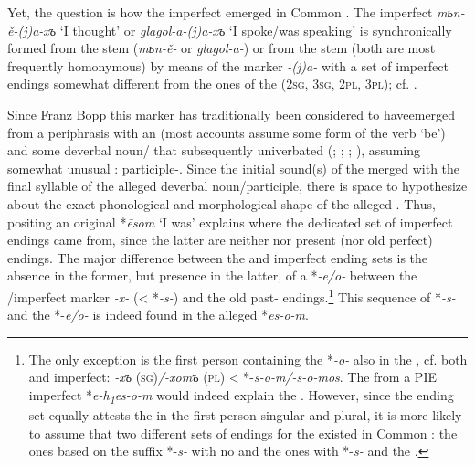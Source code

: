 \documentclass[output=paper]{langsci/langscibook}
\begin{document}
Yet, the question is how the imperfect emerged in Common . The  imperfect \textit{m}\textit{ь}\textit{n-ě-(j)a-x}\textit{ъ} ‘I thought’ or \textit{glagol-a-(j)a-x}\textit{ъ} ‘I spoke/was speaking’ is synchronically formed from the  stem (\textit{m}\textit{ь}\textit{n-ě-} or \textit{glagol-a-}) or from the  stem (both are most frequently homonymous) by means of the marker \textit{-(j)a-} with a set of imperfect endings somewhat different from the ones of the  (\textsc{2sg, 3sg, 2pl, 3pl}); cf. \citet[359]{Pohl1971}.

Since Franz Bopp this marker has traditionally been considered to have\linebreak emerged from a periphrasis with an  (most accounts assume some form of the verb ‘be’) and some deverbal noun/ that subsequently univerbated (\citealt{Leskien1919}; \citealt[82]{Stang1942}; \citealt[253ff.]{Kortlandt1986}; \citealt{Lühr1999}), assuming somewhat unusual : participle-. Since the initial sound(s) of the  merged with the final syllable of the alleged deverbal noun\slash par\-ti\-ci\-ple, there is space to hypothesize about the exact phonological and morphological shape of the alleged . Thus, positing an original  *\textit{ēsom} ‘I was’ explains where the dedicated set of imperfect endings came from, since the latter are neither  nor present (nor old perfect) endings. The major difference between the  and imperfect ending sets is the absence in the former, but presence in the latter, of a  *\textit{-e/o-} between the /imperfect marker \textit{-x-} (< *\textit{-s-}) and the old past- endings.\footnote{The only exception is the first person containing the  *\textit{-o-} also in the , cf. both  and imperfect: \textit{-x}\textit{ъ} (\textsc{sg})\textit{/-xom}\textit{ъ} (\textsc{pl}) < *-\textit{s-o-m/-s-o-mos}. The  from a PIE imperfect *\textit{e-h\textsubscript{1}es-o-m} would indeed explain the . However, since the  ending set equally attests the  in the first person singular and plural, it is more likely to assume that two different sets of endings for the  existed in Common : the ones based on the suffix *-\textit{s-} with no  and the ones with *-\textit{s-} and the .} This sequence of *\textit{-s-} and the  *-\textit{e/o-} is indeed found in the alleged *\textit{ēs-o-m}.
\end{document}
